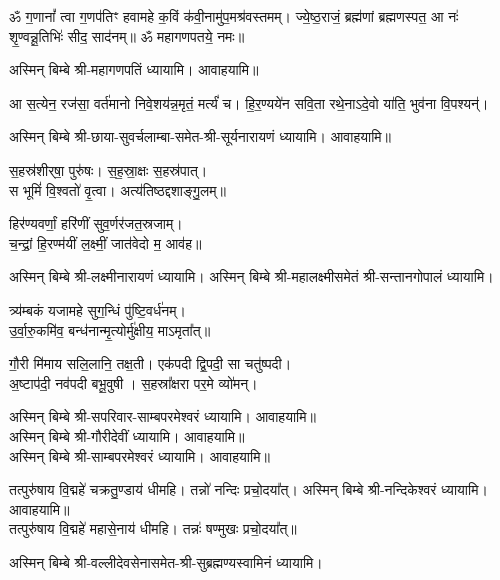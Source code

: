 







\begin{center}


ॐ ग॒णानां᳚ त्वा ग॒णप॑तिꣳ हवामहे क॒विं क॑वी॒नामु॑प॒मश्र॑\-वस्तमम्। 
ज्ये॒ष्ठ॒राजं॒ ब्रह्म॑णां ब्रह्मणस्पत॒ आ नः॑ शृ॒ण्वन्नू॒तिभिः॑ सीद॒ साद॑नम्॥ 
ॐ महागणपतये॒ नमः॥ 

अस्मिन् बिम्बे श्री-महागणपतिं ध्यायामि। आवाहयामि॥

आ स॒त्येन॒ रज॑सा॒ वर्त॑मानो निवे॒शय॑न्न॒मृतं॒ मर्त्यं॑ च। हि॒र॒ण्यये॑न सवि॒ता रथे॒नाऽदे॒वो या॑ति॒ भुव॑ना वि॒पश्यन्॑।

अस्मिन् बिम्बे श्री-छाया-सुवर्चलाम्बा-समेत-श्री-सूर्यनारायणं ध्यायामि। आवाहयामि॥


स॒हस्र॑शीर्‌षा॒ पुरु॑षः। स॒ह॒स्रा॒क्षः स॒हस्र॑पात्।\\
स भूमिं॑ वि॒श्वतो॑ वृ॒त्वा। अत्य॑तिष्ठद्दशाङ्गु॒लम्॥

हिर॑ण्यवर्णां॒ हरि॑णीं सुव॒र्णर॑जत॒स्रजाम्।\\
च॒न्द्रां॒ हि॒रण्म॑यीं ल॒क्ष्मीं॒ जात॑वेदो म॒ आव॑ह॥

अस्मिन् बिम्बे श्री-लक्ष्मीनारायणं ध्यायामि।
अस्मिन् बिम्बे श्री-महालक्ष्मीसमेतं श्री-सन्तानगोपालं ध्यायामि।

त्र्य॑म्बकं यजामहे सुग॒न्धिं पु॑ष्टि॒वर्ध॑नम्।\\
उ॒र्वा॒रु॒कमि॑व॒ बन्ध॑नान्मृ॒त्योर्मु॑क्षीय॒ माऽमृता᳚त्॥

गौ॒री मि॑माय सलि॒लानि॒ तक्ष॒ती। एक॑पदी द्वि॒पदी॒ सा चतु॑ष्पदी।\\
अ॒ष्टाप॑दी॒ नव॑पदी बभू॒वुषी। स॒हस्रा᳚क्षरा पर॒मे व्यो॑मन्।

अस्मिन् बिम्बे श्री-सपरिवार-साम्बपरमेश्वरं ध्यायामि। आवाहयामि॥\\
अस्मिन् बिम्बे श्री-गौरीदेवीं ध्यायामि। आवाहयामि॥\\
अस्मिन् बिम्बे श्री-साम्बपरमेश्वरं ध्यायामि। आवाहयामि॥

तत्पुरु॑षाय वि॒द्महे॑ चक्रतु॒ण्डाय॑ धीमहि। तन्नो॑ नन्दिः प्रचो॒दया᳚त्। 
अस्मिन् बिम्बे श्री-नन्दिकेश्वरं ध्यायामि। आवाहयामि॥\\

तत्पुरु॑षाय वि॒द्महे॑ महासे॒नाय॑ धीमहि। तन्नः॑ षण्मुखः प्रचो॒दया᳚त्॥

अस्मिन् बिम्बे श्री-वल्लीदेवसेनासमेत-श्री-सुब्रह्मण्यस्वामिनं ध्यायामि। 


\end{center}
